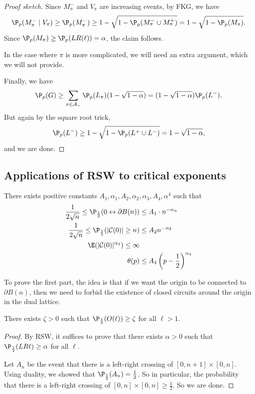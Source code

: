 \documentclass[a4paper]{article}
\begin{document}
\begin{proof}[Proof sketch]
  Since $M_\pi^-$ and $V_\pi$ are increasing events, by FKG, we have
  \[
    \P_p(M_\pi^- \mid V_\pi) \geq \P_p(M_\pi^-) \geq 1 - \sqrt{1 - \P_p(M_\pi^- \cup M_\pi^+)} = 1 - \sqrt{1 - \P_p(M_\pi)}.
  \]
  Since $\P_p(M_\pi) \geq \P_p(LR(\ell)) = \alpha$, the claim follows.

  In the case where $\pi$ is more complicated, we will need an extra argument, which we will not provide.

  Finally, we have
  \[
    \P_p(G) \geq \sum_{\pi \in \mathcal{A}_-} \P_p(L_\pi) (1 - \sqrt{1 - \alpha}) = (1 - \sqrt{1 - \alpha})\P_p(L^-).
  \]
  But again by the square root trick,
  \[
    \P_p(L^-) \geq 1 - \sqrt{1 - \P_p(L^+ \cup L^-)} = 1 - \sqrt{1 - \alpha},
  \]
  and we are done.
\end{proof}

\subsection{Applications of RSW to critical exponents}
\begin{thm}
  There exists positive constants $A_1, \alpha_1, A_2, \alpha_2, \alpha_3, A_4, \alpha^4$ such that
  \begin{align*}
    \frac{1}{2\sqrt{n}} \leq \P_{\frac{1}{2}} (0 \leftrightarrow \partial B(n)) &\leq A_1 \cdot n^{-\alpha_n}\\
    \frac{1}{2\sqrt{n}} \leq \P_{\frac{1}{2}} (|\mathcal{C}(0)| \geq n) &\leq A_2 n^{-\alpha_2}\\
    \E(|\mathcal{C}(0)|^{\alpha_3}) \leq \infty\\
    \theta(p) &\leq A_4 \left(p - \frac{1}{2}\right)^{\alpha_4}
  \end{align*}
\end{thm}
To prove the first part, the idea is that if we want the origin to be connected to $\partial B(n)$, then we need to forbid the existence of closed circuits around the origin in the dual lattice.

\begin{lemma}
  There exists $\zeta > 0$ such that $\P_{\frac{1}{2}}(O(\ell)) \geq \zeta$ for all $\ell > 1$.
\end{lemma}

\begin{proof}
  By RSW, it suffices to prove that there exists $\alpha > 0$ such that $\P_{\frac{1}{2}} (LR \ell) \geq \alpha$ for all $\ell$.

  Let $A_n$ be the event that there is a left-right crossing of $[0, n + 1] \times [0, n]$. Using duality, we showed that $\P_{\frac{1}{2}}(A_n) = \frac{1}{2}$. So in particular, the probability that there is a left-right crossing of $[0, n] \times [0, n] \geq \frac{1}{2}$. So we are done.

\end{proof}
\end{document}
